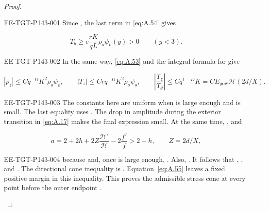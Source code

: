 \begin{proof}
%
\begin{EESegment}{EE-TGT-P143-001}
Since , the last term in \eqref{eq:A.54} gives
\end{EESegment}
\[
  T_\theta\geq c\frac{rK}{qL}\rho_o\psi_o(y)>0\qquad(y<3).
\]
\begin{EESegment}{EE-TGT-P143-002}
In the same way, \eqref{eq:A.53} and the integral formula for  give
\end{EESegment}
\begin{equation}
  |p_z|\leq Cq^{-D}K^2\rho_o\psi_o,
  \qquad |T_z|\leq Crq^{-D}K^2\rho_o\psi_o,
  \qquad \left|\frac{T_z}{T_\theta}\right|\leq Cq^{1-D}K
  =CE_{\mathrm{pow}}\mathcal H(2d/X).
  \tag{A.55}\label{eq:A.55}
\end{equation}
\begin{EESegment}{EE-TGT-P143-003}
The constants here are uniform when  is large enough and
 is small. The last equality uses . The drop in amplitude during
the exterior transition in \eqref{eq:A.17} makes the final expression small. At the same time,
, and
\end{EESegment}
\begin{equation}
  a=2+2h+2Z\frac{\mathcal H'}{\mathcal H}-2\frac{f'}f>2+h,
  \qquad Z=2d/X,
  \tag{A.56}\label{eq:A.56}
\end{equation}
\begin{EESegment}{EE-TGT-P143-004}
because  and, once  is large enough,
. Also, . It follows that
,
, and
. The directional cone inequality is
. Equation~\eqref{eq:A.55} leaves a fixed positive margin in this
inequality. This proves the admissible stress cone at every point before the outer endpoint
.
\end{EESegment}


\end{proof}
